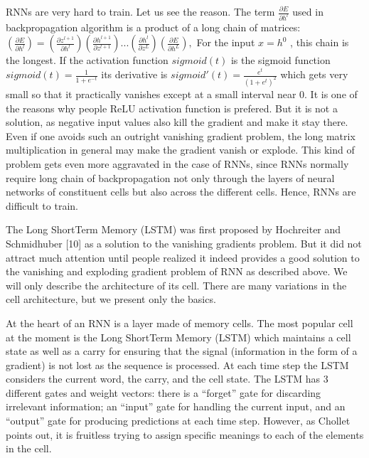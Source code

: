 \documentclass[letterpaper,10pt,english]{jupyterBook}
\begin{document}
\sphinxAtStartPar
{}

\sphinxAtStartPar
RNNs are very hard to train. Let us see the reason. The term  \( \frac{\partial E}{\partial h^l} \) used in backpropagation algorithm is a
product of a long chain of matrices: \( \left( \frac {\partial
E}{\partial h^l} \right ) = \left ( \frac {\partial
z^{l+1}}{\partial h^l} \right ) \left ( \frac {\partial
h^{l+1}}{\partial z^{l+1}} \right )...\left ( \frac {\partial
h^l}{\partial z^L} \right ) \left ( \frac {\partial E}{\partial
h^L} \right ), \) For the input \( x=h^0 \) , this chain is the
longest. If the activation function  \( sigmoid(t) \) is the sigmoid
function \( sigmoid(t) = \frac{1}{1+e^{-t}} \) its derivative is \(
sigmoid'(t) = \frac{e^t} { \left( 1 + e^t \right ) ^2 } \) which
gets very small so that it practically vanishes except at a small
interval near 0.  It is one of the reasons why people ReLU activation
function is prefered. But it is not a solution, as negative input values
also kill the gradient and make it stay there. Even if one avoids such
an outright vanishing gradient problem, the long matrix multiplication
in general may make the gradient vanish or explode. This kind of problem
gets even more aggravated in the case of RNNs, since RNNs normally
require long chain of backpropagation not only through the layers of
neural networks of constituent cells but also across the different
cells. Hence, RNNs are difficult to train.

\sphinxAtStartPar
{}

\sphinxAtStartPar
The Long Short\sphinxhyphen{}Term Memory (LSTM) was first proposed by Hochreiter and
Schmidhuber {[}10{]} as a solution to the vanishing gradients problem. But
it did not attract much attention until people realized it indeed
provides a good solution to the vanishing and exploding gradient problem
of RNN as described above. We will only describe the architecture of its
cell. There are many variations in the cell architecture, but we present
only the basics.

\sphinxAtStartPar
At the heart of an RNN is a layer made of memory cells. The most popular
cell at the moment is the Long Short\sphinxhyphen{}Term Memory (LSTM) which maintains
a cell state as well as a carry for ensuring that the signal
(information in the form of a gradient) is not lost as the sequence is
processed. At each time step the LSTM considers the current word, the
carry, and the cell state. The LSTM has 3 different gates and weight
vectors: there is a “forget” gate for discarding irrelevant information;
an “input” gate for handling the current input, and an “output” gate for
producing predictions at each time step. However, as Chollet points out,
it is fruitless trying to assign specific meanings to each of the
elements in the cell.
\end{document}
